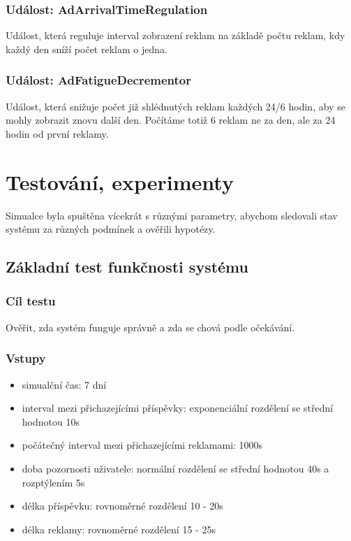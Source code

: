 \documentclass[11pt, a4paper]{article}
\begin{document}
\subsubsection{Událost: AdArrivalTimeRegulation}
Událost, která reguluje interval zobrazení reklam na základě počtu reklam, kdy každý den sníží počet reklam o jedna.
\subsubsection{Událost: AdFatigueDecrementor}
Událost, která snižuje počet již shlédnutých reklam každých 24/6 hodin, aby se mohly zobrazit znovu další den. Počítáme totiž 6 reklam ne za den, ale za 24 hodin od první reklamy.


\section{Testování, experimenty}
Simualce byla spuštěna vícekrát s různými parametry, abychom sledovali stav systému za různých podmínek a ověřili hypotézy.

\subsection{Základní test funkčnosti systému}

\subsubsection{Cíl testu}
Ověřit, zda systém funguje správně a zda se chová podle očekávání.

\subsubsection{Vstupy}
\begin{itemize}
    \item simualční čas: 7 dní
    \item interval mezi přichazejícími příspěvky: exponenciální rozdělení se střední hodnotou 10s
    \item počátečný interval mezi přichazejícími reklamami: 1000s
    \item doba pozornosti uživatele: normální rozdělení se střední hodnotou 40s a rozptýlením 5s
    \item délka příspěvku: rovnoměrné rozdělení 10 - 20s
    \item délka reklamy: rovnoměrné rozdělení 15 - 25s
\end{itemize}
\end{document}
